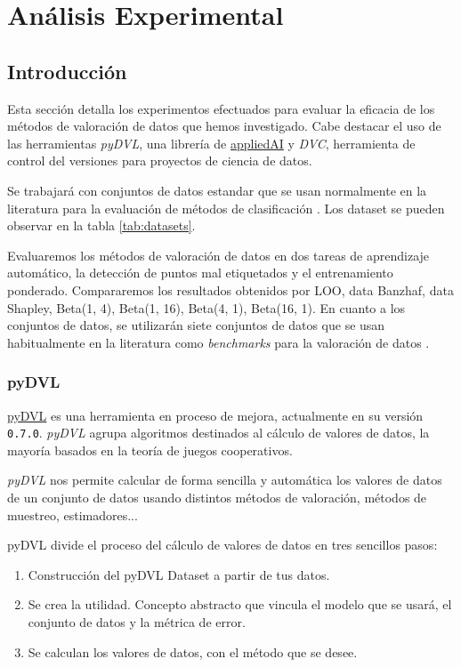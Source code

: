 \chapter{Análisis Experimental}

\section*{Introducción}
Esta sección detalla los experimentos efectuados para evaluar la
eficacia de los métodos de valoración de datos que
hemos investigado. Cabe destacar el uso de las herramientas
\textit{pyDVL}, una librería de
\href{https://www.appliedai.de/en/}{appliedAI} y \textit{DVC},
herramienta de control del versiones para proyectos de ciencia
de datos.

Se trabajará con conjuntos de datos estandar que se usan normalmente
en la literatura para la evaluación de métodos de clasificación
\cite{dataBanzhaf}.
Los dataset se pueden observar en la tabla \ref{tab:datasets}.

Evaluaremos los métodos de valoración de datos en dos
tareas de aprendizaje automático, la detección de puntos
mal etiquetados y el entrenamiento ponderado.
Compararemos los resultados obtenidos por LOO, data Banzhaf,
data Shapley, Beta(1, 4), Beta(1, 16),
Beta(4, 1), Beta(16, 1). %
En cuanto a los conjuntos de datos, se utilizarán siete
conjuntos de datos que se usan habitualmente en la literatura
como \textit{benchmarks} para la valoración de datos 
\cite{dataBanzhaf}.



\subsection*{pyDVL}

\href{https://aai-institute.github.io/pyDVL/0.7.0/}{pyDVL} es una
herramienta en proceso de mejora, actualmente en su versión
\texttt{0.7.0}. \textit{pyDVL} agrupa algoritmos destinados al
cálculo de valores de datos, la mayoría basados en la teoría de
juegos cooperativos.

\textit{pyDVL} nos permite calcular de forma sencilla y
automática los valores de datos de un conjunto de datos
usando distintos métodos de valoración, métodos de
muestreo, estimadores... 

pyDVL divide el  proceso del cálculo de valores de datos
en tres sencillos pasos:
\begin{enumerate}
    \item Construcción del pyDVL Dataset a partir de tus datos.
    \item Se crea la utilidad. Concepto abstracto que vincula
    el modelo que se usará, el conjunto de datos y la métrica
    de error.
    \item Se calculan los valores de datos, con el método que
    se desee.
\end{enumerate}

